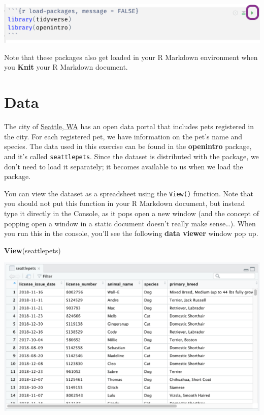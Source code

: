 \documentclass[
]{article}
\newenvironment{Shaded}{\begin{snugshade}}{\end{snugshade}}
\newcommand{\FunctionTok}[1]{\textcolor[rgb]{0.13,0.29,0.53}{\textbf{#1}}}
\newcommand{\NormalTok}[1]{#1}
\begin{document}
\begin{flushleft}\includegraphics[width=0.8\linewidth]{img/load-packages-chunk} \end{flushleft}

Note that these packages also get loaded in your R Markdown environment
when you \textbf{Knit} your R Markdown document.

\section{Data}\label{data}

The city of \href{https://en.wikipedia.org/wiki/Seattle}{Seattle, WA}
has an open data portal that includes pets registered in the city. For
each registered pet, we have information on the pet's name and species.
The data used in this exercise can be found in the \textbf{openintro}
package, and it's called \texttt{seattlepets}. Since the dataset is
distributed with the package, we don't need to load it separately; it
becomes available to us when we load the package.

You can view the dataset as a spreadsheet using the \texttt{View()}
function. Note that you should not put this function in your R Markdown
document, but instead type it directly in the Console, as it pops open a
new window (and the concept of popping open a window in a static
document doesn't really make sense\ldots). When you run this in the
console, you'll see the following \textbf{data viewer} window pop up.

\begin{Shaded}
\begin{Highlighting}[]
\FunctionTok{View}\NormalTok{(seattlepets)}
\end{Highlighting}
\end{Shaded}

\begin{flushleft}\includegraphics[width=0.8\linewidth]{img/view-data} \end{flushleft}
\end{document}
